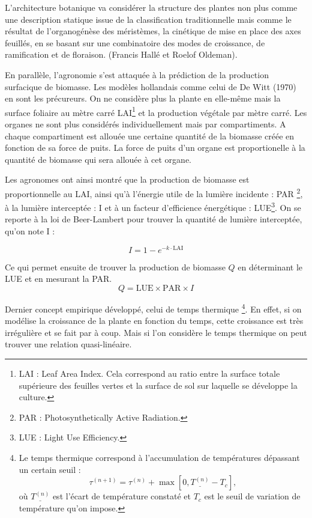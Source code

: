L’architecture botanique va considérer la structure des plantes non plus comme une description statique issue de la classification traditionnelle mais comme le résultat de l’organogénèse des méristèmes, la cinétique de mise en place des axes feuillés, en se basant sur une combinatoire des modes de croissance, de ramification et de floraison. (Francis Hallé et Roelof Oldeman).

En parallèle, l’agronomie s’est attaquée à la prédiction de la production surfacique de biomasse. Les modèles hollandais comme celui de De Witt (1970) en sont les précureurs. On ne considère plus la plante en elle-même mais la surface foliaire au mètre carré LAI\footnote{LAI : Leaf Area Index.
Cela correspond au ratio entre la surface totale supérieure des feuilles
vertes et la surface de sol sur laquelle se développe la culture.} 
et la production végétale par mètre carré.
Les organes ne sont plus considérés individuellement mais par compartiments. A chaque compartiment est allouée une certaine quantité de la biomasse créée en fonction de sa force de 
puits.
La force de puits d'un organe est proportionelle à la quantité de biomasse qui sera allouée à cet organe.\cite[~p.229--231]{hopkins2003physiologie} 

Les agronomes ont ainsi montré que la production de biomasse est proportionnelle au LAI, ainsi qu'à l’énergie utile de la lumière incidente : PAR \footnote{PAR : Photosynthetically Active Radiation.}, à la lumière interceptée : I et à un facteur d’efficience énergétique : LUE\footnote{LUE : Light Use Efficiency.}. On se reporte à la loi de Beer-Lambert pour trouver la quantité de lumière interceptée, qu'on note I : 

\[ I = 1-e^{-k\cdot\mathrm{LAI}} \]

Ce qui permet ensuite de trouver la production de biomasse $Q$
en déterminant le LUE et en mesurant la PAR.
\[ 
  Q = \mathrm{LUE}\times\mathrm{PAR}\times I 
\]

Dernier concept empirique développé, celui de temps thermique
\footnote{Le temps thermique correspond à l'accumulation de températures dépassant un certain seuil :
\[
\tau^{(n+1)} = \tau^{(n)} + \max[0, \underline{T^{(n)}} - T_c], 
\]
où $\underline{T^{(n)}}$ est l'écart de température constaté et 
$T_c$ est le seuil de variation de température qu'on impose.
}.
En effet, si on modélise la croissance de la plante  en fonction du temps, cette croissance est très irrégulière et se fait par à coup. Mais si l’on considère le temps thermique on peut trouver une relation quasi-linéaire.

